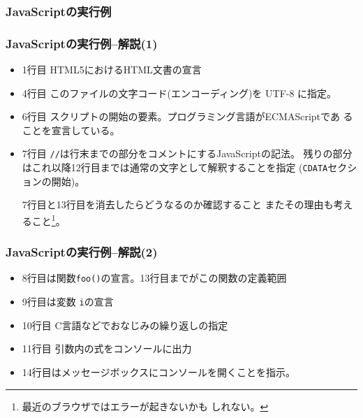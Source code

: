 \begin{frame}[containsverbatim]
\frametitle{JavaScriptの実行例}
\end{frame}
\begin{frame}[containsverbatim]
\frametitle{JavaScriptの実行例--解説(1)}
\begin{itemize}
 \item 1行目 HTML5におけるHTML文書の宣言
 \item 4行目 このファイルの文字コード(エンコーディング)を UTF-8 に指定。
 \item 6行目 スクリプトの開始の要素。プログラミング言語がECMAScriptであ
       ることを宣言している。
 \item 7行目 \texttt{//}は行末までの部分をコメントにするJavaScriptの記法。
残りの部分はこれ以降12行目までは通常の文字として解釈することを指定
       (\texttt{CDATA}セクションの開始)。

      7行目と13行目を消去したらどうなるのか確認すること
またその理由も考えること\footnote{最近のブラウザではエラーが起きないかも
       しれない。}。
\end{itemize}
 \end{frame}
\begin{frame}[containsverbatim]
\frametitle{JavaScriptの実行例--解説(2)}
\begin{itemize}
\item 8行目は関数\Verb+foo()+の宣言。13行目までがこの関数の定義範囲
 \item 9行目は変数 \texttt{i}の宣言
 \item 10行目 C言語などでおなじみの繰り返しの指定
 \item 11行目 引数内の式をコンソールに出力
 \item 14行目はメッセージボックスにコンソールを開くことを指示。
\end{itemize}
\end{frame}


